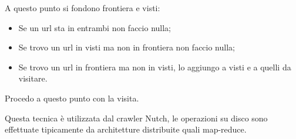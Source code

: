 A questo punto si fondono frontiera e visti: 
\begin{itemize}
    \item Se un url sta in entrambi non faccio nulla;
    \item Se trovo un url in visti ma non in frontiera non faccio nulla;
    \item Se trovo un url in frontiera ma non in visti, lo aggiungo a visti e 
    a quelli da visitare.
\end{itemize}
Procedo a questo punto con la visita.
\begin{remark}
    Questa tecnica è utilizzata dal crawler Nutch, le operazioni su disco 
    sono effettuate tipicamente da architetture distribuite quali map-reduce.
\end{remark}
